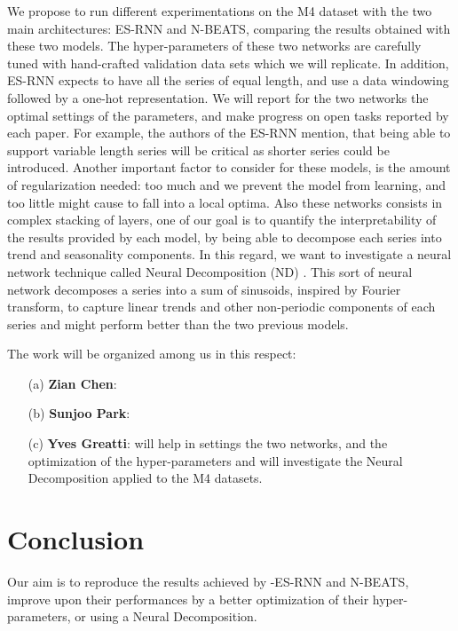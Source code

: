 \documentclass{article}
\begin{document}
We propose to run different experimentations on the M4 dataset with the two main architectures: ES-RNN and N-BEATS, comparing the results obtained with these two models.
The hyper-parameters of these two networks are carefully tuned with hand-crafted validation data sets which we will replicate. 
In addition, ES-RNN expects to have all the series of equal length, and use a data windowing followed by a one-hot representation.
We will report for the two networks the optimal settings of the parameters, and make progress on open tasks reported by each paper.
For example, the authors of the ES-RNN mention, that being able to support variable length series will be critical as shorter series could be introduced.
Another important factor to consider for these models, is the amount of regularization needed: too much and we prevent the model from learning, and too little might cause to fall into a local optima.
Also these networks consists in complex stacking of layers, one of our goal is to quantify the interpretability of the results provided 
by each model, by being able to decompose each series into trend and seasonality components. 
In this regard, we want to investigate a neural network technique called Neural Decomposition (ND) \cite{NeuralDecomposition}. This sort of neural network
decomposes a series into a sum of sinusoids, inspired by Fourier transform, to capture linear trends and other non-periodic components of each series and might perform better than the two previous models.

The work will be organized among us in this respect: 
\begin{itemize}
	\item[(a)] \textbf{Zian Chen}: 
	\item[(b)] \textbf{Sunjoo Park}: 
	\item[(c)] \textbf{Yves Greatti}: will help in settings the two networks, and the optimization of the hyper-parameters and will investigate the Neural Decomposition applied to the M4 datasets.
\end{itemize}

\section{Conclusion}
Our aim is to reproduce the results achieved by -ES-RNN and N-BEATS, improve upon their performances by a better optimization of their hyper-parameters, or using a Neural Decomposition.
 

\end{document}
